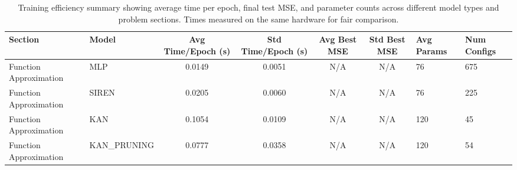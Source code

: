 \begin{table}
\caption{Training efficiency summary showing average time per epoch, final test MSE, and parameter counts across different model types and problem sections. Times measured on the same hardware for fair comparison.}
\label{tab:convergence_summary}
\begin{tabular}{|l|l|c|c|c|c|}
\toprule
Section & Model & Avg Time/Epoch (s) & Std Time/Epoch (s) & Avg Best MSE & Std Best MSE & Avg Params & Num Configs \\
\midrule
Function Approximation & MLP & 0.0149 & 0.0051 & N/A & N/A & 76 & 675 \\
Function Approximation & SIREN & 0.0205 & 0.0060 & N/A & N/A & 76 & 225 \\
Function Approximation & KAN & 0.1054 & 0.0109 & N/A & N/A & 120 & 45 \\
Function Approximation & KAN_PRUNING & 0.0777 & 0.0358 & N/A & N/A & 120 & 54 \\
\bottomrule
\end{tabular}
\end{table}
